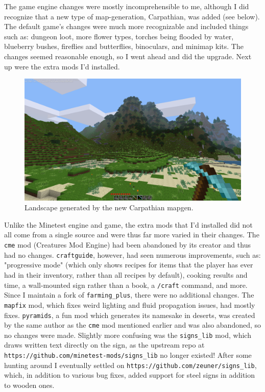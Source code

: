 \documentclass{article}
\begin{document}
The game engine changes were mostly incomprehensible to me, although I did recognize that a new type of map-generation, Carpathian, was added (see below).  The default game's changes were much more recognizable and included things such as: dungeon loot, more flower types, torches being flooded by water, blueberry bushes, fireflies and butterflies, binoculars, and minimap kits.  The changes seemed reasonable enough, so I went ahead and did the upgrade.  Next up were the extra mods I'd installed.

\begin{figure}
\begin{center}
\includegraphics[scale=0.25]{files/blog/2019_07_20_minetest_5_0_1_upgrade_and_server_hosting/2019_07_20_carpathian_mapgen.png}
\caption{Landscape generated by the new Carpathian mapgen.}
\end{center}
\end{figure}

Unlike the Minetest engine and game, the extra mods that I'd installed did not all come from a single source and were thus far more varied in their changes.  The \texttt{cme} mod (Creatures Mod Engine) had been abandoned by its creator and thus had no changes.  \texttt{craftguide}, however, had seen numerous improvements, such as: "progressive mode" (which only shows recipes for items that the player has ever had in their inventory, rather than all recipes by default), cooking results and time, a wall-mounted sign rather than a book, a \texttt{/craft} command, and more.  Since I maintain a fork of \texttt{farming_plus}, there were no additional changes.  The \texttt{mapfix} mod, which fixes weird lighting and fluid propagation issues, had mostly fixes.  \texttt{pyramids}, a fun mod which generates its namesake in deserts, was created by the same author as the \texttt{cme} mod mentioned earlier and was also abandoned, so no changes were made.  Slightly more confusing was the \texttt{signs_lib} mod, which draws written text directly on the sign, as the upstream repo at \texttt{https://github.com/minetest-mods/signs_lib} no longer existed!  After some hunting around I eventually settled on \texttt{https://github.com/zeuner/signs_lib}, which, in addition to various bug fixes, added support for steel signs in addition to wooden ones.
\end{document}
